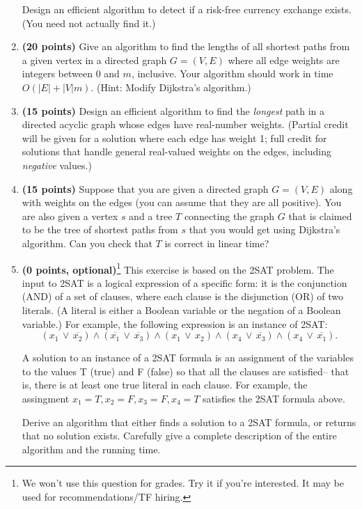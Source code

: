 \documentclass[11pt]{article}
\begin{document}
\begin{enumerate}
Design an efficient algorithm to detect if a risk-free currency exchange
exists.  (You need not actually find it.)


\item 
{\bf (20 points)}
Give an algorithm to find the lengths of all shortest paths from a given vertex in
a directed graph $G = (V,E)$ where all edge weights are integers between $0$ and $m$, inclusive. 
Your algorithm should work in time $O(|E|+|V|m)$.
(Hint: Modify Dijkstra's algorithm.)

\item 
{\bf (15 points)}
Design an efficient algorithm to find the {\em longest} path in
a directed acyclic graph whose edges have real-number weights. 
 (Partial credit will be given for a solution
where each edge has weight 1; full credit for solutions that handle
general real-valued weights on the edges, including {\em negative} values.)


\item 
{\bf (15 points)}
Suppose that you are given a directed graph $G=(V,E)$ along with
weights on the edges (you can assume that they are all positive).  You
are also given a vertex $s$ and a tree $T$ connecting the graph $G$
that is claimed to be the tree of shortest paths from $s$ that you
would get using Dijkstra's algorithm.  Can you check that $T$ is correct
in linear time?

\item
{\bf (0 points, optional)}\footnote{We won't use this question for grades. Try it if you're interested. 
It may be used for recommendations/TF hiring.}
This exercise is based on the 2SAT problem.  The input to
2SAT is a logical expression of a specific form:  it is the
conjunction (AND) of a set of clauses, where each clause is the
disjunction (OR) of two literals.  (A literal is either a Boolean
variable or the negation of a Boolean variable.)  For example, the
following expression is an instance of 2SAT:
$$(x_1 \, \vee \, \overline{x_2}) \wedge (\overline{x_1} \, \vee \,
\overline{x_3}) \wedge (x_1 \, \vee \, x_2) \wedge (x_4 \, \vee \, \overline{x_3})
\wedge (x_4 \, \vee \, \overline{x_1}).$$
 
A solution to an instance of a 2SAT formula is an assignment of the
variables to the values T (true) and F (false) so that all the clauses
are satisfied-- that is, there is at least one true literal in each
clause.  For example, the assingment $x_1 = T, x_2 = F, x_3 = F, x_4 =
T$ satisfies the 2SAT formula above.
 
Derive an algorithm that either finds a solution to a 2SAT formula, 
or returns that no solution exists. Carefully give a complete
description of the entire algorithm and the running time.


\end{enumerate}
\end{document}

